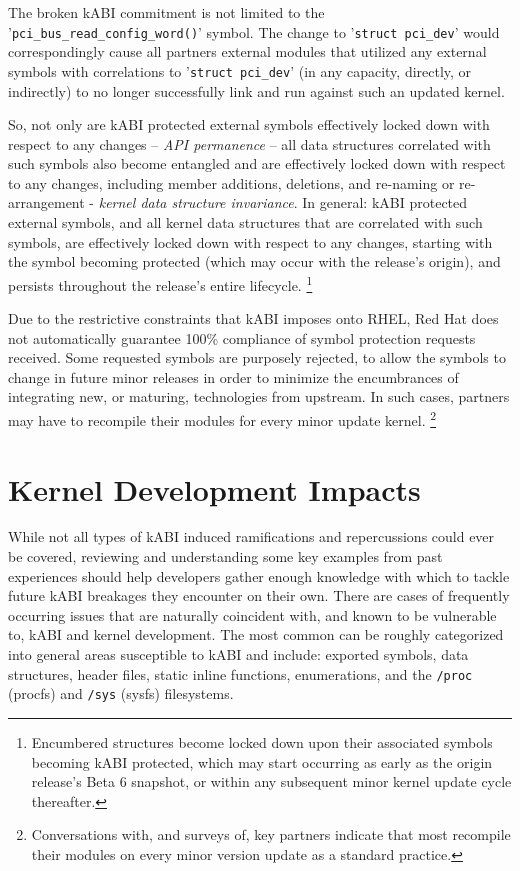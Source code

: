 \documentclass[10pt,oneside,english]{book}
\begin{document}
The broken kABI commitment is not limited to the '\texttt{pci\_bus\_read\_config\_word()}'
symbol. The change to '\texttt{struct pci\_dev}' would correspondingly
cause all partners external modules that utilized any external symbols
with correlations to '\texttt{struct pci\_dev}' (in any capacity,
directly, or indirectly) to no longer successfully link and run against
such an updated kernel.

So, not only are kABI protected external symbols effectively locked
down with respect to any changes -- \emph{API permanence} -- all
data structures correlated with such symbols also become entangled
and are effectively locked down with respect to any changes, including
member additions, deletions, and re-naming or re-arrangement - \emph{kernel
data structure invariance}. In general: kABI protected external symbols,
and all kernel data structures that are correlated with such symbols,
are effectively locked down with respect to any changes, starting
with the symbol becoming protected (which may occur with the release's
origin), and persists throughout the release's entire lifecycle. \footnote{\label{fn:c3f5}Encumbered structures become locked down upon their
associated symbols becoming kABI protected, which may start occurring
as early as the origin release's Beta 6 snapshot, or within any subsequent
minor kernel update cycle thereafter.}

Due to the restrictive constraints that kABI imposes onto RHEL, Red
Hat does not automatically guarantee 100\% compliance of symbol protection
requests received. Some requested symbols are purposely rejected,
to allow the symbols to change in future minor releases in order to
minimize the encumbrances of integrating new, or maturing, technologies
from upstream. In such cases, partners may have to recompile their
modules for every minor update kernel. \footnote{Conversations with, and surveys of, key partners indicate that most
recompile their modules on every minor version update as a standard
practice.}

\section{Kernel Development Impacts}

While not all types of kABI induced ramifications and repercussions
could ever be covered, reviewing and understanding some key examples
from past experiences should help developers gather enough knowledge
with which to tackle future kABI breakages they encounter on their
own. There are cases of frequently occurring issues that are naturally
coincident with, and known to be vulnerable to, kABI and kernel development.
The most common can be roughly categorized into general areas susceptible
to kABI and include: exported symbols, data structures, header files,
static inline functions, enumerations, and the \texttt{/proc} (procfs)
and \texttt{/sys} (sysfs) filesystems.
\end{document}
